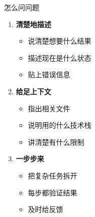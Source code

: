 \documentclass[aspectratio=169,xcolor=dvipsnames]{beamer}
\begin{document}
\begin{frame}{怎么问问题}
  \begin{enumerate}
    \item \textbf{清楚地描述}
    \begin{itemize}
      \item 说清楚想要什么结果
      \item 描述现在是什么状态
      \item 贴上错误信息
    \end{itemize}

    \vspace{0.3cm}

    \item \textbf{给足上下文}
    \begin{itemize}
      \item 指出相关文件
      \item 说明用的什么技术栈
      \item 讲清楚有什么限制
    \end{itemize}

    \vspace{0.3cm}

    \item \textbf{一步步来}
    \begin{itemize}
      \item 把复杂任务拆开
      \item 每步都验证结果
      \item 及时给反馈
    \end{itemize}
  \end{enumerate}
\end{frame}
\end{document}
